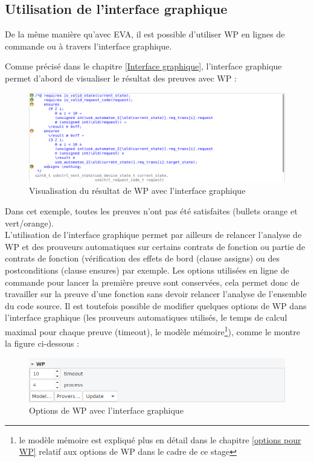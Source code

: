 \subsection{Utilisation de l'interface graphique}

De la même manière qu'avec EVA, il est possible d'utiliser WP en lignes de commande ou à travers l'interface graphique.

Comme précisé dans le chapitre \ref{Interface graphique}, l'interface graphique permet d'abord de visualiser le résultat des preuves avec WP :


\begin{figure}[!h]
\centering
\includegraphics[width=18cm]{images/interface_bullet.png}
\caption{Visualisation du résultat de WP avec l'interface graphique}
\label{Visualisation du résultat de WP avec l'interface graphique}
\end{figure}

\newpage

Dans cet exemple, toutes les preuves n'ont pas été satisfaites (bullets orange et vert/orange).
\\
\noindent
L'utilisation de l'interface graphique permet par ailleurs de relancer l'analyse de WP et des prouveurs automatiques sur certains contrats de fonction ou partie de contrats de fonction (vérification des effets de bord (clause assigns) ou des postconditions (clause ensures) par exemple. Les options utilisées en ligne de commande pour lancer la première preuve sont conservées, cela permet donc de travailler sur la preuve d'une fonction sans devoir relancer l'analyse de l'ensemble du code source. Il est toutefois possible de modifier quelques options de WP dans l'interface graphique (les prouveurs automatiques utilisés, le temps de calcul maximal pour chaque preuve (timeout), le modèle mémoire\footnote{le modèle mémoire est expliqué plus en détail dans le chapitre \ref{options pour WP} relatif aux options de WP dans le cadre de ce stage}), comme le montre la figure ci-dessous :

\begin{figure}[!h]
\centering
\includegraphics[width=18cm]{images/options_wp_GUI.png}
\caption{Options de WP avec l'interface graphique}
\label{Options de WP avec l'interface graphique}
\end{figure}

